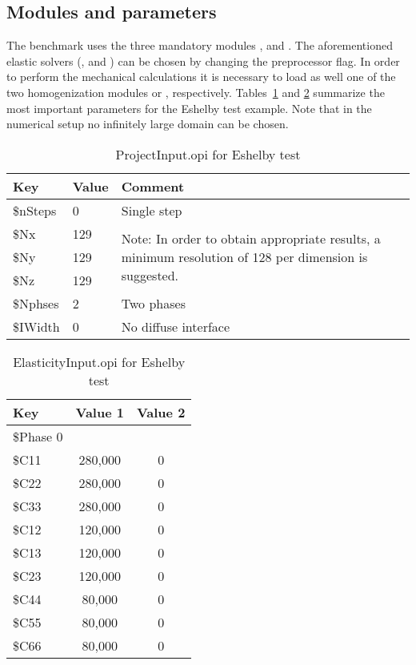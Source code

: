 \subsection{Modules and parameters}
The benchmark uses the three mandatory modules ,  and . The aforementioned elastic solvers (,  and ) can be chosen by changing the preprocessor flag. In order to perform the mechanical calculations it is necessary to load  as well one of the two homogenization modules  or , respectively. Tables~\ref{tab:EshelbyTest_prInput} and \cref{tab:EshelbyTest_elInput} summarize the most important parameters for the Eshelby test example. Note that in the numerical setup no infinitely large domain can be chosen.
\begin{table}[ht]
\centering
\begin{tabular}{lll}
\toprule
Key & Value & Comment \\
\midrule
\$nSteps & 0 & Single step\\
\$Nx & 129 & \multirow{3}{8cm}{Note: In order to obtain appropriate results, a minimum resolution of 128 per dimension is suggested.}\\
\$Ny & 129 & \\
\$Nz & 129 & \\
\$Nphses & 2 & Two phases\\
\$IWidth & 0 & No diffuse interface\\
\bottomrule
\end{tabular}
\label{tab:EshelbyTest_prInput}
\caption{ProjectInput.opi for Eshelby test}
\end{table}
\begin{table}[ht]
\centering
\begin{tabular}{lcc}
\toprule
Key & Value 1 & Value 2 \\
\midrule
\$Phase 0\\
\$C11 & 280,000 &  0\\
\$C22 & 280,000 &  0\\
\$C33 & 280,000 &  0\\
\$C12 & 120,000 &  0\\
\$C13 & 120,000 &  0\\
\$C23 & 120,000 &  0\\
\$C44 & 80,000 &   0\\
\$C55 & 80,000 &  0\\
\$C66 & 80,000 &  0\\
\bottomrule
\end{tabular}
\caption{ElasticityInput.opi for Eshelby test}
\label{tab:EshelbyTest_elInput}
\end{table}
